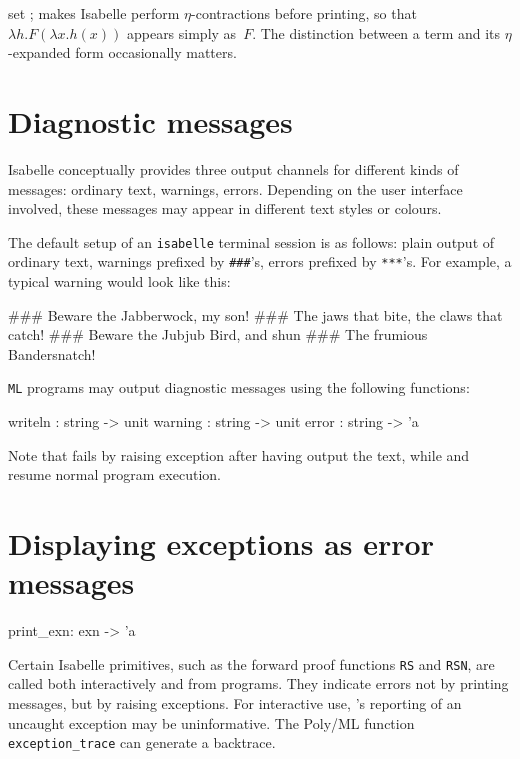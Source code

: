 \begin{ttdescription}
\item[set \ttindexbold{eta_contract};]
makes Isabelle perform $\eta$-contractions before printing, so that
$\lambda h.F(\lambda x.h(x))$ appears simply as~$F$.  The
distinction between a term and its $\eta$-expanded form occasionally
matters.
\end{ttdescription}

\section{Diagnostic messages}

Isabelle conceptually provides three output channels for different kinds of
messages: ordinary text, warnings, errors.  Depending on the user interface
involved, these messages may appear in different text styles or colours.

The default setup of an \texttt{isabelle} terminal session is as
follows: plain output of ordinary text, warnings prefixed by
\texttt{\#\#\#}'s, errors prefixed by \texttt{***}'s.  For example, a
typical warning would look like this:
\begin{ttbox}
\#\#\# Beware the Jabberwock, my son!
\#\#\# The jaws that bite, the claws that catch!
\#\#\# Beware the Jubjub Bird, and shun
\#\#\# The frumious Bandersnatch!
\end{ttbox}

\texttt{ML} programs may output diagnostic messages using the
following functions:
\begin{ttbox}
writeln : string -> unit
warning : string -> unit
error   : string -> 'a
\end{ttbox}
Note that  fails by raising exception 
after having output the text, while  and
 resume normal program execution.


\section{Displaying exceptions as error messages}
\begin{ttbox} 
print_exn: exn -> 'a
\end{ttbox}
Certain Isabelle primitives, such as the forward proof functions {\tt RS}
and {\tt RSN}, are called both interactively and from programs.  They
indicate errors not by printing messages, but by raising exceptions.  For
interactive use, \ML's reporting of an uncaught exception may be
uninformative.  The Poly/ML function {\tt exception_trace} can generate a
backtrace.


